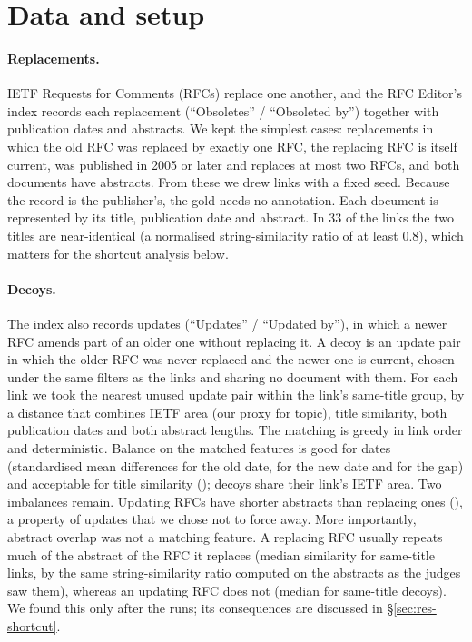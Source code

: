 \section{Data and setup}
\label{sec:studies}
\label{sec:study2}

\paragraph{Replacements.}
IETF Requests for Comments (RFCs) replace one another, and the RFC Editor's index \citep{rfcindex2026} records each
replacement (``Obsoletes'' / ``Obsoleted by'') together with publication dates and abstracts. We kept the simplest
cases: replacements in which the old RFC was replaced by exactly one RFC, the replacing RFC is itself current, was
published in 2005 or later and replaces at most two RFCs, and both documents have abstracts. From these we drew
\ENLinks{} links with a fixed seed. Because the record is the publisher's, the gold needs no annotation. Each document
is represented by its title, publication date and abstract. In 33 of the \ENLinks{} links the two titles are
near-identical (a normalised string-similarity ratio of at least 0.8), which matters for the shortcut analysis below.

\paragraph{Decoys.}
The index also records updates (``Updates'' / ``Updated by''), in which a newer RFC amends part of an older one without
replacing it. A decoy is an update pair in which the older RFC was never replaced and the newer one is current, chosen
under the same filters as the links and sharing no document with them. For each link we took the nearest unused update
pair within the link's same-title group, by a distance that combines IETF area (our proxy for topic), title similarity,
both publication dates and both abstract lengths. The matching is greedy in link order and deterministic. Balance on
the matched features is good for dates (standardised mean differences \EBalOldYearSMD{} for the old date,
\EBalNewYearSMD{} for the new date and \EBalGapYearsSMD{} for the gap) and acceptable for title similarity
(\EBalTitleRatioSMD); \EBalArea{} decoys share their link's IETF area. Two imbalances remain. Updating RFCs have shorter
abstracts than replacing ones (\EBalNewWordsSMD), a property of updates that we chose not to force away. More
importantly, abstract overlap was not a matching feature. A replacing RFC usually repeats much of the abstract of the
RFC it replaces (median similarity \EAbsSimLinksSame{} for same-title links, by the same string-similarity ratio
computed on the abstracts as the judges saw them), whereas an updating RFC does not (median
\EAbsSimDecoysSame{} for same-title decoys). We found this only after the runs; its consequences are discussed in
\S\ref{sec:res-shortcut}.

